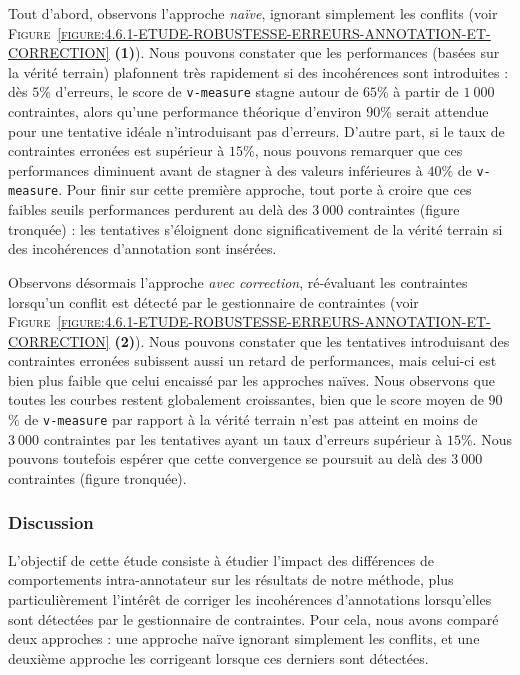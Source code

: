 			Tout d'abord, observons l'approche \textit{naïve}, ignorant simplement les conflits (voir \textsc{Figure~\ref{figure:4.6.1-ETUDE-ROBUSTESSE-ERREURS-ANNOTATION-ET-CORRECTION}} \textbf{(1)}).
			Nous pouvons constater que les performances (basées sur la vérité terrain) plafonnent très rapidement si des incohérences sont introduites : dès $5$\% d'erreurs, le score de \texttt{v-measure} stagne autour de $65$\% à partir de $1~000$ contraintes, alors qu'une performance théorique d'environ $90$\% serait attendue pour une tentative idéale n'introduisant pas d'erreurs.
			D'autre part, si le taux de contraintes erronées est supérieur à $15$\%, nous pouvons remarquer que ces performances diminuent avant de stagner à des valeurs inférieures à $40$\% de \texttt{v-measure}.
			Pour finir sur cette première approche, tout porte à croire que ces faibles seuils performances perdurent au delà des $3~000$ contraintes (figure tronquée) : les tentatives s'éloignent donc significativement de la vérité terrain si des incohérences d'annotation sont insérées.
			
			Observons désormais l'approche \textit{avec correction}, ré-évaluant les contraintes lorsqu'un conflit est détecté par le gestionnaire de contraintes (voir \textsc{Figure~\ref{figure:4.6.1-ETUDE-ROBUSTESSE-ERREURS-ANNOTATION-ET-CORRECTION}} \textbf{(2)}).
			Nous pouvons constater que les tentatives introduisant des contraintes erronées subissent aussi un retard de performances, mais celui-ci est bien plus faible que celui encaissé par les approches naïves.
			Nous observons que toutes les courbes restent globalement croissantes, bien que le score moyen de $90$\% de \texttt{v-measure} par rapport à la vérité terrain n'est pas atteint en moins de $3~000$ contraintes par les tentatives ayant un taux d'erreurs supérieur à $15$\%.
			Nous pouvons toutefois espérer que cette convergence se poursuit au delà des $3~000$ contraintes (figure tronquée).
		
		\subsubsection{Discussion}
		
			L'objectif de cette étude consiste à étudier l'impact des différences de comportements intra-annotateur sur les résultats de notre méthode, plus particulièrement l'intérêt de corriger les incohérences d'annotations lorsqu'elles sont détectées par le gestionnaire de contraintes.
			Pour cela, nous avons comparé deux approches : une approche naïve ignorant simplement les conflits, et une deuxième approche les corrigeant lorsque ces derniers sont détectées.
		
